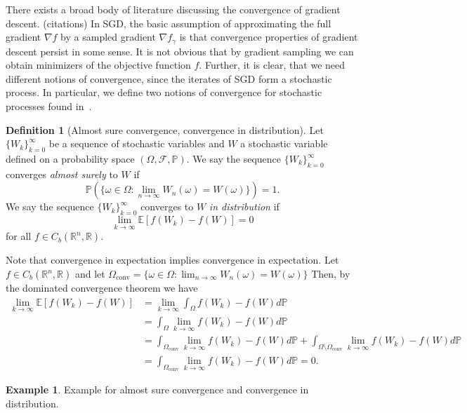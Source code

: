 \documentclass[12pt]{article}
\theoremstyle{definition}
\newtheorem{definition}[theorem]{Definition}
\newtheorem{example}[theorem]{Example}
\numberwithin{equation}{section}
\newcommand{\R}{\mathbb{R}}
\newcommand{\BP}{\mathbb{P}}
\newcommand{\CF}{\mathcal{F}}
\newcommand{\ev}[1]{\mathbb{E}\left[{#1}\right]}
\begin{document}
There exists a broad body of literature discussing the convergence of gradient descent. (citations) In SGD, the basic assumption of approximating the full gradient $\nabla f$ by a sampled gradient $\nabla f_{\gamma}$ is that convergence properties of gradient descent persist in some sense. It is not obvious that by gradient sampling we can obtain minimizers of the objective function $f$. Further, it is clear, that we need different notions of convergence, since the iterates of SGD form a stochastic process. In particular, we define two notions of convergence for stochastic processes found in~\autocite{eAppliedStochasticAnalysis2021}.
\begin{definition}[Almost sure convergence, convergence in distribution]
Let $\{W_k\}_{k=0}^{\infty}$ be a sequence of stochastic variables and $W$ a stochastic variable defined on a probability space $(\Omega, \CF, \BP)$. We say the sequence $\{W_k\}_{k=0}^{\infty}$ converges \emph{almost surely} to $W$ if
\begin{equation}
  \BP(\{\omega \in \Omega : \lim_{n \rightarrow \infty}W_n(\omega) = W(\omega)\}) = 1.
\end{equation}
We say the sequence  $\{W_k\}_{k=0}^{\infty}$ converges to $W$ \emph{in distribution} if
  \begin{equation}
    \lim_{k \rightarrow \infty}\ev{f(W_k) - f(W)} = 0
  \end{equation}
  for all $f \in C_b(\R^n, \R)$.
\end{definition}
Note that convergence in expectation implies convergence in expectation. Let $f \in C_b(\R^n, \R)$ and let $\Omega_{\text{conv}} = \{\omega \in \Omega : \lim_{n \rightarrow \infty}W_n(\omega) = W(\omega)\}$ Then, by the dominated convergence theorem we have 
\begin{align*}
  \lim_{k \rightarrow \infty} \ev{f(W_k) - f(W)} &= \lim_{k \rightarrow \infty}\int_{\Omega} f(W_k) - f(W) d\BP \\
  &= \int_{\Omega} \lim_{k \rightarrow \infty} f(W_k) - f(W) d\BP \\
  &= \int_{\Omega_{\text{conv}}} \lim_{k \rightarrow \infty} f(W_k) - f(W) d\BP
   + \int_{\Omega \setminus \Omega_{\text{conv}}} \lim_{k \rightarrow \infty} f(W_k) - f(W) d\BP \\
  &= \int_{\Omega_{\text{conv}}} \lim_{k \rightarrow \infty} f(W_k) - f(W) d\BP = 0.
\end{align*}

\begin{example}
  Example for almost sure convergence and convergence in distribution.
\end{example}
\end{document}
